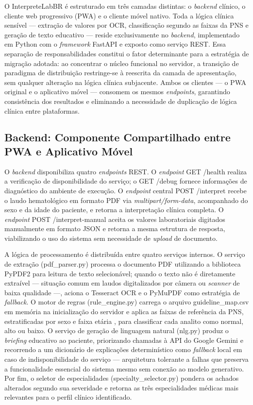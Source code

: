 \documentclass[12pt]{article}
\begin{document}
O InterpreteLabBR é estruturado em três camadas distintas: o
\textit{backend} clínico, o cliente web progressivo (PWA) e o cliente
móvel nativo. Toda a lógica clínica sensível — extração de valores por
OCR, classificação segundo as faixas da PNS e geração de texto educativo
— reside exclusivamente no \textit{backend}, implementado em Python com
o \textit{framework} FastAPI e exposto como serviço REST. Essa separação
de responsabilidades constitui o fator determinante para a estratégia de
migração adotada: ao concentrar o núcleo funcional no servidor, a transição
de paradigma de distribuição restringe-se à reescrita da camada de
apresentação, sem qualquer alteração na lógica clínica subjacente. Ambos
os clientes — o PWA original e o aplicativo móvel — consomem os mesmos
\textit{endpoints}, garantindo consistência dos resultados e eliminando a
necessidade de duplicação de lógica clínica entre plataformas.

\subsection{Backend: Componente Compartilhado entre PWA e Aplicativo Móvel}

O \textit{backend} disponibiliza quatro \textit{endpoints} REST. O
\textit{endpoint} GET /health realiza a verificação de disponibilidade do
serviço; o GET /debug fornece informações de diagnóstico do ambiente de
execução. O \textit{endpoint} central POST /interpret recebe o laudo
hematológico em formato PDF via \textit{multipart/form-data}, acompanhado
do sexo e da idade do paciente, e retorna a interpretação clínica completa.
O \textit{endpoint} POST /interpret-manual aceita os valores laboratoriais
digitados manualmente em formato JSON e retorna a mesma estrutura de
resposta, viabilizando o uso do sistema sem necessidade de \textit{upload}
de documento.

A lógica de processamento é distribuída entre quatro serviços internos.
O serviço de extração (pdf\_parser.py) processa o documento PDF
utilizando a biblioteca PyPDF2 para leitura de texto selecionável; quando
o texto não é diretamente extraível — situação comum em laudos
digitalizados por câmera ou \textit{scanner} de baixa qualidade
\cite{lima2024} —, aciona o Tesseract OCR e o PyMuPDF como estratégia
de \textit{fallback}. O motor de regras (rule\_engine.py) carrega o
arquivo guideline\_map.csv em memória na inicialização do servidor e
aplica as faixas de referência da PNS, estratificadas por sexo e faixa
etária \cite{rosenfeld2019}, para classificar cada analito como normal,
alto ou baixo. O serviço de geração de linguagem natural (nlg.py) produz
o \textit{briefing} educativo ao paciente, priorizando chamadas à API do
Google Gemini e recorrendo a um dicionário de explicações determinístico
como \textit{fallback} local em caso de indisponibilidade do serviço —
arquitetura tolerante a falhas que preserva a funcionalidade essencial do
sistema mesmo sem conexão ao modelo generativo. Por fim, o seletor de
especialidades (specialty\_selector.py) pondera os achados alterados
segundo sua severidade e retorna as três especialidades médicas mais
relevantes para o perfil clínico identificado.
\end{document}

